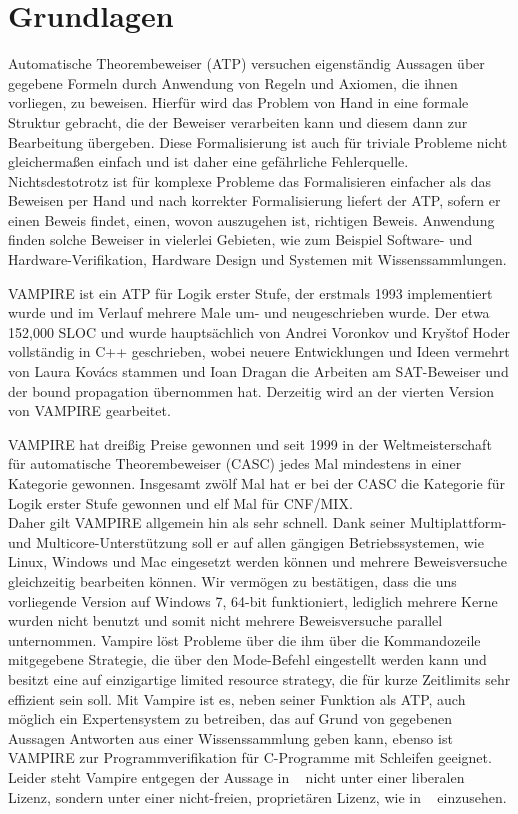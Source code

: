 \documentclass{acm_proc_article-sp-german}
\begin{document}
\section{Grundlagen}
\label{sec:foundations}
Automatische Theorembeweiser (ATP) versuchen eigenständig Aussagen über gegebene Formeln durch Anwendung von Regeln und Axiomen, die ihnen vorliegen, zu beweisen.
Hierfür wird das Problem von Hand in eine formale Struktur gebracht, die der Beweiser verarbeiten kann und diesem dann zur Bearbeitung übergeben.
Diese Formalisierung ist auch für triviale Probleme nicht gleichermaßen einfach und ist daher eine gefährliche Fehlerquelle. 
Nichtsdestotrotz ist für komplexe Probleme das Formalisieren einfacher als das Beweisen per Hand und nach korrekter Formalisierung liefert der ATP, 
sofern er einen Beweis findet, einen, wovon auszugehen ist, richtigen Beweis. 
Anwendung finden solche Beweiser in vielerlei Gebieten, wie zum Beispiel Software- und Hardware-Verifikation, Hardware Design und Systemen mit Wissenssammlungen.

VAMPIRE ist ein ATP für Logik erster Stufe, der erstmals 1993 implementiert wurde und im Verlauf mehrere Male um- und neugeschrieben wurde.
Der etwa 152,000 SLOC und wurde hauptsächlich von Andrei Voronkov und Kry{\v{s}}tof Hoder vollständig in C++ geschrieben, 
wobei neuere Entwicklungen und Ideen vermehrt von Laura Kov{\'a}cs stammen und Ioan Dragan die Arbeiten am SAT-Beweiser und der bound propagation übernommen hat.
Derzeitig wird an der vierten Version von VAMPIRE gearbeitet.

VAMPIRE hat dreißig Preise gewonnen und seit 1999 in der Weltmeisterschaft für automatische Theorembeweiser (CASC) jedes Mal mindestens in einer Kategorie gewonnen.
Insgesamt zwölf Mal hat er bei der CASC die Kategorie für Logik erster Stufe gewonnen und elf Mal für CNF/MIX. ~\cite{vampirehp} \\ Daher gilt VAMPIRE allgemein hin als sehr schnell.
Dank seiner Multiplattform- und Multicore-Unterstützung soll er auf allen gängigen Betriebssystemen, wie Linux, Windows und Mac eingesetzt werden können und mehrere Beweisversuche gleichzeitig bearbeiten können.
Wir vermögen zu bestätigen, dass die uns vorliegende Version auf Windows 7, 64-bit funktioniert, lediglich mehrere Kerne wurden nicht benutzt und somit nicht mehrere Beweisversuche parallel unternommen.
Vampire löst Probleme über die ihm über die Kommandozeile mitgegebene Strategie, die über den Mode-Befehl eingestellt werden kann und besitzt eine auf einzigartige limited resource strategy, die für kurze Zeitlimits sehr effizient sein soll. Mit Vampire ist es, neben seiner Funktion als ATP, auch möglich ein Expertensystem zu betreiben, das auf Grund von gegebenen Aussagen Antworten aus einer Wissenssammlung geben kann, ebenso ist VAMPIRE zur Programmverifikation für C-Programme mit Schleifen geeignet. 
Leider steht Vampire entgegen der Aussage in ~\cite{cav2013} nicht unter einer liberalen Lizenz, sondern unter einer nicht-freien, proprietären Lizenz, wie in ~\cite{vampirehp} einzusehen. 
\end{document}
